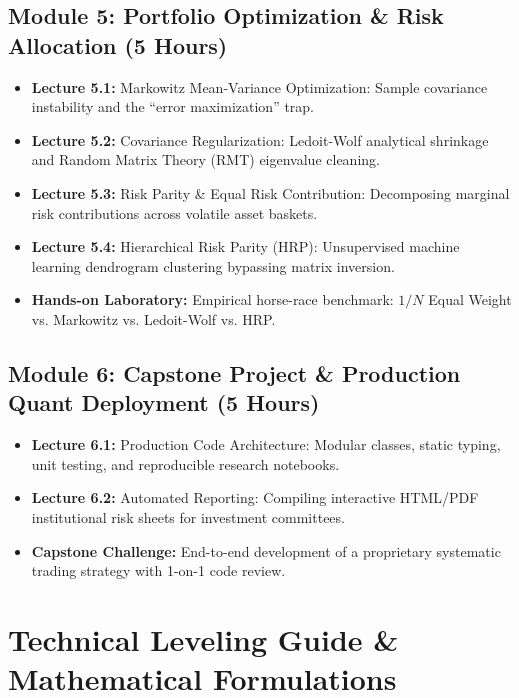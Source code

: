 \documentclass[11pt,a4paper]{article}
\begin{document}
\subsection*{Module 5: Portfolio Optimization \& Risk Allocation (5 Hours)}
\begin{itemize}[leftmargin=1.5em]
    \item \textbf{Lecture 5.1:} Markowitz Mean-Variance Optimization: Sample covariance instability and the ``error maximization'' trap.
    \item \textbf{Lecture 5.2:} Covariance Regularization: Ledoit-Wolf analytical shrinkage and Random Matrix Theory (RMT) eigenvalue cleaning.
    \item \textbf{Lecture 5.3:} Risk Parity \& Equal Risk Contribution: Decomposing marginal risk contributions across volatile asset baskets.
    \item \textbf{Lecture 5.4:} Hierarchical Risk Parity (HRP): Unsupervised machine learning dendrogram clustering bypassing matrix inversion.
    \item \textbf{Hands-on Laboratory:} Empirical horse-race benchmark: $1/N$ Equal Weight vs. Markowitz vs. Ledoit-Wolf vs. HRP.
\end{itemize}

\subsection*{Module 6: Capstone Project \& Production Quant Deployment (5 Hours)}
\begin{itemize}[leftmargin=1.5em]
    \item \textbf{Lecture 6.1:} Production Code Architecture: Modular classes, static typing, unit testing, and reproducible research notebooks.
    \item \textbf{Lecture 6.2:} Automated Reporting: Compiling interactive HTML/PDF institutional risk sheets for investment committees.
    \item \textbf{Capstone Challenge:} End-to-end development of a proprietary systematic trading strategy with 1-on-1 code review.
\end{itemize}

\vspace{10pt}

\section{Technical Leveling Guide \& Mathematical Formulations}
\end{document}
